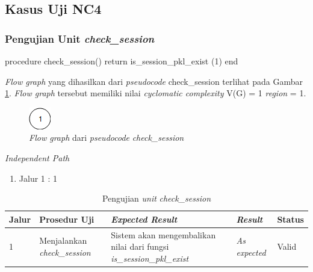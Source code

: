 \subsection{Kasus Uji NC4}

\subsubsection{Pengujian Unit \emph{check\_session}}

\begin{code}
\begin{ignasicblock}[title=check\_session,minted language=text]
procedure check_session()
    return is_session_pkl_exist (1)
end
\end{ignasicblock}
\label{pc:check_session}
\end{code}

\par\null\par
\noindent
\emph{Flow graph} yang dihasilkan dari \emph{pseudocode}
check\_session terlihat pada Gambar \ref{cfg:check_session}.
\emph{Flow graph} tersebut memiliki nilai \emph{cyclomatic complexity} V(G) = 1 \emph{region} = 1.

\begin{figure}[H]
  \centering
  \includegraphics[width=.06\linewidth]{img/test-case/1node}
  \caption{\emph{Flow graph} dari \emph{pseudocode} \emph{check\_session}}
  \label{cfg:check_session}
\end{figure}

\noindent
\emph{Independent Path}

\begin{enumerate}
\item Jalur 1 : 1
\end{enumerate}

\begin{longtable}{|P{.06\textwidth}|P{.30\textwidth}|P{.30\textwidth}|P{.10\textwidth}|P{.08\textwidth}|}
  \caption{Pengujian \emph{unit} \emph{check\_session}} \label{jalur:check_session} \\
  \hline
  \textbf{Jalur} & \textbf{Prosedur Uji} & \textbf{\emph{Expected Result}}
  & \textbf{\emph{Result}} & \textbf{Status} \\\hline
  1 & Menjalankan \emph{check\_session} & Sistem akan mengembalikan nilai dari fungsi
                                          \emph{is\_session\_pkl\_exist} & \emph{As expected} & Valid \\\hline
\end{longtable}

